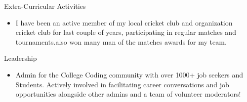 \documentclass{resume} %
\begin{document}
\begin{rSection}{Extra-Curricular Activities} 
\begin{itemize} 
    \item  I have been an active member of my local cricket club and organization cricket club for last couple of years,  participating in regular matches and tournaments.also won many man of the matches awards for my team.
\end{itemize}


\end{rSection}

\begin{rSection}{Leadership} 
\begin{itemize}
    \item Admin for the {College Coding community} with over 1000+ job seekers and Students. Actively involved in facilitating  career conversations and job opportunities alongside other admins and a team of volunteer moderators! 
\end{itemize}


\end{rSection}
\end{document}
